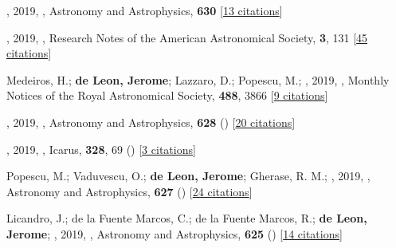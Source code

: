 \item[{\color{numcolor}\scriptsize106}] , 2019, , Astronomy and Astrophysics, \textbf{630} [\href{https://ui.adsabs.harvard.edu/abs/2019A&A...630A.141M}{13 citations}]

\item[{\color{numcolor}\scriptsize105}] , 2019, , Research Notes of the American Astronomical Society, \textbf{3}, 131 [\href{https://ui.adsabs.harvard.edu/abs/2019RNAAS...3..131D}{45 citations}]

\item[{\color{numcolor}\scriptsize104}] Medeiros, H.; \textbf{de Leon, Jerome}; Lazzaro, D.; Popescu, M.; \etal, 2019, , Monthly Notices of the Royal Astronomical Society, \textbf{488}, 3866 [\href{https://ui.adsabs.harvard.edu/abs/2019MNRAS.488.3866M}{9 citations}]

\item[{\color{numcolor}\scriptsize103}] , 2019, , Astronomy and Astrophysics, \textbf{628} () [\href{https://ui.adsabs.harvard.edu/abs/2019A&A...628A..64P}{20 citations}]

\item[{\color{numcolor}\scriptsize102}] , 2019, , Icarus, \textbf{328}, 69 () [\href{https://ui.adsabs.harvard.edu/abs/2019Icar..328...69R}{3 citations}]

\item[{\color{numcolor}\scriptsize101}] Popescu, M.; Vaduvescu, O.; \textbf{de Leon, Jerome}; Gherase, R. M.; \etal, 2019, , Astronomy and Astrophysics, \textbf{627} () [\href{https://ui.adsabs.harvard.edu/abs/2019A&A...627A.124P}{24 citations}]

\item[{\color{numcolor}\scriptsize100}] Licandro, J.; de la Fuente Marcos, C.; de la Fuente Marcos, R.; \textbf{de Leon, Jerome}; \etal, 2019, , Astronomy and Astrophysics, \textbf{625} () [\href{https://ui.adsabs.harvard.edu/abs/2019A&A...625A.133L}{14 citations}]


